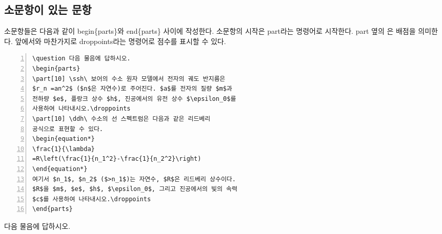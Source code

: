 \documentclass[]{gshs_exam_S}
\begin{document}
\begin{multicols*}{2}
\subsection{소문항이 있는 문항}

소문항들은 다음과 같이 {\ttfamily{\textbackslash}begin\{parts\}}와 {\ttfamily{\textbackslash}end\{parts\}} 사이에 작성한다. 소문항의 시작은 {\ttfamily{\textbackslash}part}라는 명령어로 시작한다. {\ttfamily{\textbackslash}part} 옆의 {\ttfamily[10]}은 배점을 의미한다. 앞에서와 마찬가지로 {\ttfamily{\textbackslash}droppoints}라는 명령어로 점수를 표시할 수 있다.
\begin{Verbatim}[frame=single,fontsize=\footnotesize,numbers=left,xleftmargin=5mm]
\question 다음 물음에 답하시오.
\begin{parts}
\part[10] \ssh\ 보어의 수소 원자 모델에서 전자의 궤도 반지름은
$r_n =an^2$ ($n$은 자연수)로 주어진다. $a$를 전자의 질량 $m$과
전하량 $e$, 플랑크 상수 $h$, 진공에서의 유전 상수 $\epsilon_0$를
사용하여 나타내시오.\droppoints
\part[10] \ddh\ 수소의 선 스펙트럼은 다음과 같은 리드베리 
공식으로 표현할 수 있다.
\begin{equation*}
\frac{1}{\lambda}
=R\left(\frac{1}{n_1^2}-\frac{1}{n_2^2}\right)
\end{equation*}
여기서 $n_1$, $n_2$ ($>n_1$)는 자연수, $R$은 리드베리 상수이다. 
$R$을 $m$, $e$, $h$, $\epsilon_0$, 그리고 진공에서의 빛의 속력 
$c$를 사용하여 나타내시오.\droppoints
\end{parts}
\end{Verbatim}
\par\vspace{1em}\noindent{}\vspace{-1em}
\begin{questions}\extrawidth{8.1em}\setcounter{question}{1}
\question 다음 물음에 답하시오.
\end{questions}
\end{multicols*}
\end{document}
